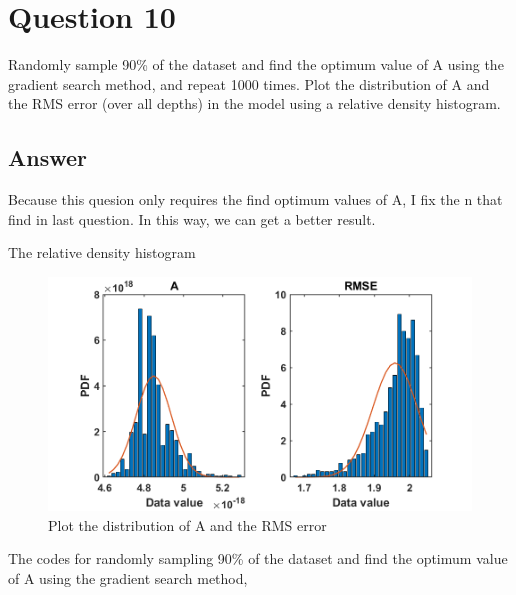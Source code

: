\documentclass[
	12pt, %
]{fphw}
\begin{document}
\clearpage
 
 \section*{Question 10 }
 
 \begin{problem}
Randomly sample 90\% of the dataset and find the optimum value of A using the gradient search method,
and repeat 1000 times. Plot the distribution of A and the RMS error (over all depths) in the model using a
relative density histogram.
 	
 \end{problem}
 
 \subsection*{Answer}
 Because this quesion only requires the find optimum values of A, I fix the n that find in last question. In this way, we can get a better result. 
 
 The relative density histogram
 \begin{figure}[htbp]
 	\centering
 	\includegraphics[width=1\columnwidth]{Q10.png} 
 	\caption{Plot the distribution of A and the RMS error }
 \end{figure}
 
The codes for randomly sampling 90\% of the dataset and find the optimum value of A using the gradient search method,
 
\end{document}

